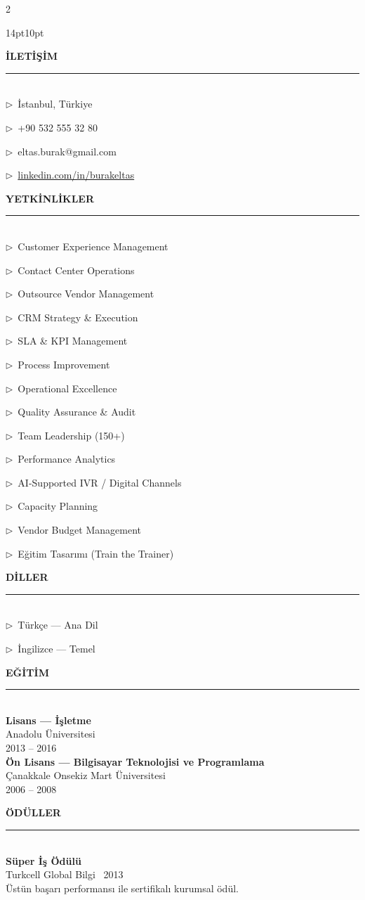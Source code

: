 \documentclass[10pt,a4paper]{article}
\newcommand{\sidebarSection}[1]{%
  \vspace{10pt}
  {\color{accent}\bfseries\fontsize{10}{12}\selectfont #1}\\[2pt]
  {\color{white!40!sidebarbg}\rule{\linewidth}{0.4pt}}\\[4pt]
}
\newcommand{\sidebarItem}[1]{{\color{white}\small $\triangleright$~#1}\par\vspace{2pt}}
\begin{document}
\begin{paracol}{2}

\begin{leftcolumn}
\color{white}
\begin{adjustwidth}{14pt}{10pt}
\vspace*{24pt}

\sidebarSection{İLETİŞİM}
\sidebarItem{İstanbul, Türkiye}
\sidebarItem{+90 532 555 32 80}
\sidebarItem{eltas.burak@gmail.com}
\sidebarItem{\href{https://linkedin.com/in/burakeltas}{linkedin.com/in/burakeltas}}

\sidebarSection{YETKİNLİKLER}
\sidebarItem{Customer Experience Management}
\sidebarItem{Contact Center Operations}
\sidebarItem{Outsource Vendor Management}
\sidebarItem{CRM Strategy \& Execution}
\sidebarItem{SLA \& KPI Management}
\sidebarItem{Process Improvement}
\sidebarItem{Operational Excellence}
\sidebarItem{Quality Assurance \& Audit}
\sidebarItem{Team Leadership (150+)}
\sidebarItem{Performance Analytics}
\sidebarItem{AI-Supported IVR / Digital Channels}
\sidebarItem{Capacity Planning}
\sidebarItem{Vendor Budget Management}
\sidebarItem{Eğitim Tasarımı (Train the Trainer)}

\sidebarSection{DİLLER}
\sidebarItem{Türkçe --- Ana Dil}
\sidebarItem{İngilizce --- Temel}

\sidebarSection{EĞİTİM}
{\color{white}\small\bfseries Lisans --- İşletme}\\
{\color{white!85!black}\small Anadolu Üniversitesi}\\
{\color{white!70!black}\small 2013 -- 2016}\\[6pt]
{\color{white}\small\bfseries Ön Lisans --- Bilgisayar Teknolojisi ve Programlama}\\
{\color{white!85!black}\small Çanakkale Onsekiz Mart Üniversitesi}\\
{\color{white!70!black}\small 2006 -- 2008}

\sidebarSection{ÖDÜLLER}
{\color{white}\small\bfseries Süper İş Ödülü}\\
{\color{white!85!black}\small Turkcell Global Bilgi \textbar\ 2013}\\
{\color{white!70!black}\small Üstün başarı performansı ile sertifikalı kurumsal ödül.}


\end{adjustwidth}
\end{leftcolumn}
\end{paracol}
\end{document}
